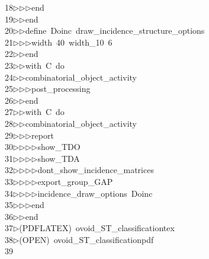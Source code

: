 \begin{tabbing}
18\>$\triangleright$\>$\triangleright$\>$\triangleright$\>end\ \\[0pt]
19\>$\triangleright$\>$\triangleright$\>end\ \\[0pt]
20\>$\triangleright$\>$\triangleright$\>define\ Doinc\ draw\_incidence\_structure\_options\ \\[0pt]
21\>$\triangleright$\>$\triangleright$\>$\triangleright$\>width\ 40\ width\_10\ 6\ \\[0pt]
22\>$\triangleright$\>$\triangleright$\>end\ \\[0pt]
23\>$\triangleright$\>$\triangleright$\>with\ C\ do\ \\[0pt]
24\>$\triangleright$\>$\triangleright$\>combinatorial\_object\_activity\ \\[0pt]
25\>$\triangleright$\>$\triangleright$\>$\triangleright$\>post\_processing\ \\[0pt]
26\>$\triangleright$\>$\triangleright$\>end\ \\[0pt]
27\>$\triangleright$\>$\triangleright$\>with\ C\ do\ \\[0pt]
28\>$\triangleright$\>$\triangleright$\>combinatorial\_object\_activity\ \\[0pt]
29\>$\triangleright$\>$\triangleright$\>$\triangleright$\>report\ \\[0pt]
30\>$\triangleright$\>$\triangleright$\>$\triangleright$\>$\triangleright$\>show\_TDO\ \\[0pt]
31\>$\triangleright$\>$\triangleright$\>$\triangleright$\>$\triangleright$\>show\_TDA\ \\[0pt]
32\>$\triangleright$\>$\triangleright$\>$\triangleright$\>$\triangleright$\>dont\_show\_incidence\_matrices\ \\[0pt]
33\>$\triangleright$\>$\triangleright$\>$\triangleright$\>$\triangleright$\>export\_group\_GAP\ \\[0pt]
34\>$\triangleright$\>$\triangleright$\>$\triangleright$\>$\triangleright$\>incidence\_draw\_options\ Doinc\ \\[0pt]
35\>$\triangleright$\>$\triangleright$\>$\triangleright$\>end\ \\[0pt]
36\>$\triangleright$\>$\triangleright$\>end\\[0pt]
37\>$\triangleright$\>(PDFLATEX)\ ovoid\_ST\_classificationtex\\[0pt]
38\>$\triangleright$\>(OPEN)\ ovoid\_ST\_classificationpdf\\[0pt]
39\>\end{tabbing}
